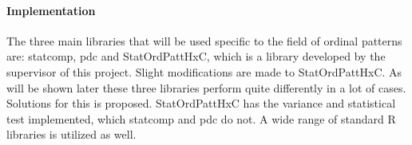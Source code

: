 \paragraph{Implementation}
The three main libraries that will be used specific to the field of ordinal patterns are: statcomp\cite{statcomp}, pdc\cite{pdc} and StatOrdPattHxC, which is a library developed by the supervisor of this project. Slight modifications are made to StatOrdPattHxC. As will be shown later these three libraries perform quite differently in a lot of cases. Solutions for this is proposed. StatOrdPattHxC has the variance and statistical test implemented, which statcomp and pdc do not. A wide range of standard R libraries is utilized as well.